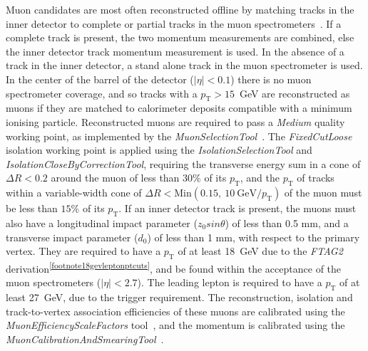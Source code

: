 \documentclass[NOTE, atlasdraft=true, texlive=2017, UKenglish]{\ATLASLATEXPATH atlasdoc}
\begin{document}
Muon candidates are most often reconstructed offline by matching tracks in the inner detector to complete or partial tracks in the muon spectrometers~\cite{Aad:2014rra}. If a complete track is present, the two momentum measurements are combined, else the inner detector track momentum measurement is used. In the absence of a track in the inner detector, a stand alone track in the muon spectrometer is used. In the center of the barrel of the detector ($\vert\eta\vert<0.1$) there is no muon spectrometer coverage, and so tracks with a $p_\text{T}>15$~GeV are reconstructed as muons if they are matched to calorimeter deposits compatible with a minimum ionising particle. Reconstructed muons are required to pass a \emph{Medium} quality working point, as implemented by the \emph{MuonSelectionTool}~\cite{MuonSelectionTool}. The \emph{FixedCutLoose} isolation working point is applied using the \emph{IsolationSelectionTool} and \emph{IsolationCloseByCorrectionTool}, requiring the transverse energy sum in a cone of $\Delta R<0.2$ around the muon of less than $30\%$ of its $p_\text{T}$, and the $p_\text{T}$ of tracks within a variable-width cone of $\Delta R<\text{Min}(0.15,\ 10\ \text{GeV}/p_\text{T})$ of the muon must be less than $15\%$ of its $p_\text{T}$. If an inner detector track is present, the muons must also have a longitudinal impact parameter ($z_0sin\theta$) of less than 0.5 mm, and a transverse impact parameter ($d_0$) of less than 1 mm, with respect to the primary vertex. They are required to have a $p_\text{T}$ of at least 18~GeV due to the \emph{FTAG2} derivation\textsuperscript{\ref{footnote18gevleptonptcuts}}, and be found within the acceptance of the muon spectrometers ($\vert\eta\vert<2.7$). The leading lepton is required to have a $p_\text{T}$ of at least 27~GeV, due to the trigger requirement. The reconstruction, isolation and track-to-vertex association efficiencies of these muons are calibrated using the \emph{MuonEfficiencyScaleFactors} tool~\cite{MuonEfficiencyScaleFactors}, and the momentum is calibrated using the \emph{MuonCalibrationAndSmearingTool}~\cite{MuonCalibrationAndSmearingTool}.
\end{document}
